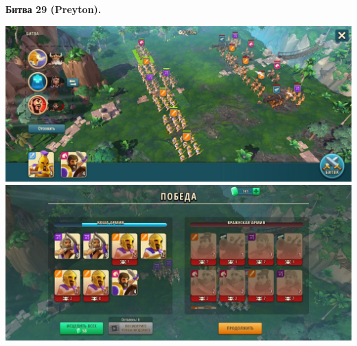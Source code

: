 \newpage
\begin{center}
	\hypertarget{fight29}{\textbf{Битва 29 (Preyton).}}
\end{center}
\noindent\includegraphics[width=\linewidth]{./parts/media/TreasureHunt/29/Preyton/29.jpg} \newline
\noindent\includegraphics[width=\linewidth]{./parts/media/TreasureHunt/29/Preyton/29..jpg} \newline

